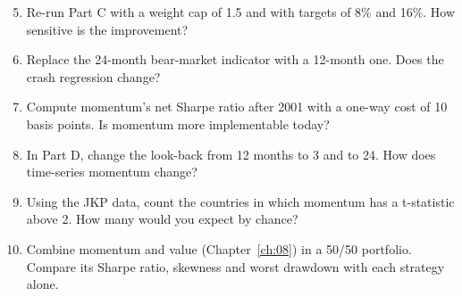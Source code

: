 \begin{enumerate}
  \setcounter{enumi}{4}
  \item Re-run Part C with a weight cap of 1.5 and with targets of 8\% and 16\%. How sensitive is the improvement?
  \item Replace the 24-month bear-market indicator with a 12-month one. Does the crash regression change?
  \item Compute momentum's net Sharpe ratio after 2001 with a one-way cost of 10 basis points. Is momentum more implementable today?
  \item In Part D, change the look-back from 12 months to 3 and to 24. How does time-series momentum change?
  \item Using the JKP data, count the countries in which momentum has a t-statistic above 2. How many would you expect by chance?
  \item Combine momentum and value (Chapter~\ref{ch:08}) in a 50/50 portfolio. Compare its Sharpe ratio, skewness and worst drawdown with each strategy alone.
\end{enumerate}
